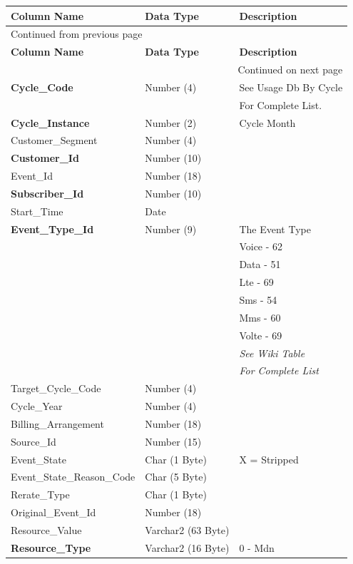 \documentclass[12pt,twoside]{article}
\begin{document}
\begin{longtable}{l|l|l}
\hline
\textbf{Column Name} & \textbf{Data Type} & \textbf{Description}\\
\hline
\endfirsthead
\multicolumn{3}{l}{Continued from previous page} \\
\hline

\textbf{Column Name} & \textbf{Data Type} & \textbf{Description} \\

\hline
\endhead
\hline\multicolumn{3}{r}{Continued on next page} \\
\endfoot
\endlastfoot
\hline
\textbf{Cycle\_Code} & Number (4) & See Usage Db By Cycle\\
&  & For Complete List.\\
\textbf{Cycle\_Instance} & Number (2) & Cycle Month\\
Customer\_Segment & Number (4) & \\
\textbf{Customer\_Id} & Number (10) & \\
Event\_Id & Number (18) & \\
\textbf{Subscriber\_Id} & Number (10) & \\
Start\_Time & Date & \\
\textbf{Event\_Type\_Id} & Number (9) & The Event Type\\
&  & Voice - 62\\
&  & Data - 51\\
&  & Lte - 69\\
&  & Sms - 54\\
&  & Mms - 60\\
&  & Volte - 69\\
&  & \emph{See Wiki Table}\\
&  & \emph{For Complete List}\\
Target\_Cycle\_Code & Number (4) & \\
Cycle\_Year & Number (4) & \\
Billing\_Arrangement & Number (18) & \\
Source\_Id & Number (15) & \\
Event\_State & Char (1 Byte) & X = Stripped\\
Event\_State\_Reason\_Code & Char (5 Byte) & \\
Rerate\_Type & Char (1 Byte) & \\
Original\_Event\_Id & Number (18) & \\
Resource\_Value & Varchar2 (63 Byte) & \\
\textbf{Resource\_Type} & Varchar2 (16 Byte) & 0 - Mdn\\

\end{longtable}
\end{document}
